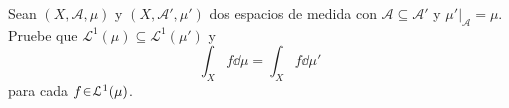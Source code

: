 \setcounter{neje}{67}
\begin{nejer}
Sean $(X, \mathcal{A}, \mu)$ y $(X, \mathcal{A}', \mu')$ dos espacios de medida con $\mathcal{A} \subseteq \mathcal{A}'$ y $\mu'|_{\mathcal{A}} = \mu$. Pruebe que $\mathcal{L}^1(\mu) \subseteq \mathcal{L}^1(\mu')$ y
$$
\int_X f \dd{\mu} = \int_X f \dd{\mu'}
$$
para cada $f \en \mathcal{L}^1(\mu)$.
    

\end{nejer}
